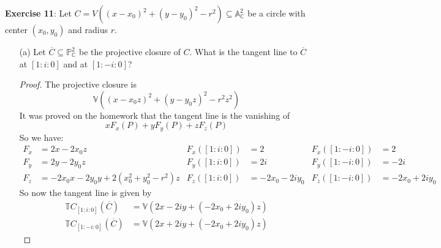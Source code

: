 \documentclass{article}
\begin{document}
\textbf{Exercise 11}: Let $C = V((x - x_{0})^{2} + (y - y_{0})^{2} - r^{2}) \subseteq \mathbb{A}_{\mathbb{C}}^{2}$ be a circle with center $(x_{0}, y_{0})$ and radius $r$. 
    \begin{itemize}
        \item [(a)] Let $\overline{C} \subseteq \mathbb{P}_{\mathbb{C}}^{2}$ be the projective closure of $C$. What is the tangent line to $\overline{C}$ at $[1 : i : 0]$ and at $[1 : -i : 0]$?
            \begin{proof}
                The projective closure is
                    \begin{equation*}
                        \mathbb{V}((x - x_{0}z)^{2} + (y - y_{0}z)^{2} - r^{2}z^{2})
                    \end{equation*}
                It was proved on the homework that the tangent line is the vanishing of
                    \begin{equation*}
                        xF_{x}(P) + yF_{y}(P) + zF_{z}(P)
                    \end{equation*}
                So we have:
                    \begin{align*}
                        F_{x} &= 2x - 2x_{0}z                                           & F_{x}([1 : i : 0]) &= 2                & F_{x}([1 : -i : 0]) &= 2                 \\
                        F_{y} &= 2y - 2y_{0}z                                           & F_{y}([1 : i : 0]) &= 2i               & F_{y}([1 : -i : 0]) &= -2i               \\
                        F_{z} &= -2x_{0}x - 2y_{0}y + 2(x_{0}^{2} + y_{0}^{2} - r^{2})z & F_{z}([1 : i : 0]) &= -2x_{0} -2iy_{0} & F_{z}([1 : -i : 0]) &= -2x_{0} + 2iy_{0}   
                    \end{align*}
                So now the tangent line is given by
                    \begin{align*}
                        \mathbb{T}C_{[1 : i : 0]}(\overline{C})  &= \mathbb{V}(2x - 2iy + (-2x_{0} + 2iy_{0})z) \\
                        \mathbb{T}C_{[1 : -i : 0]}(\overline{C}) &= \mathbb{V}(2x + 2iy + (-2x_{0} + 2iy_{0})z)   
                    \end{align*}
            \end{proof}


\end{itemize}
\end{document}
